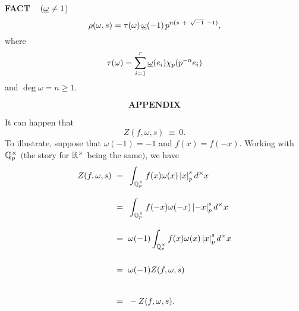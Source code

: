 \vspace{0.1cm}


\begin{x}{\small\bf FACT} \ %
$(\underline{\omega} \ne 1$)
\[
\rho(\omega,s) = \tau(\omega) \hspace{0.05cm} \underline{\omega}(-1) \hspace{0.05cm} p^{n(s \ + \ \sqrt{-1} \  -1)},
\]
where
\[
\tau(\omega) = \sum_{i = 1}^r \underline{\omega}(e_i) \chi_p(p^{-n}e_i)
\]
and $\deg \omega = n \ge 1.$
\end{x}


\[
\textbf{APPENDIX}
\]
\setcounter{theoremn}{0}


It can happen that
\\
\[
Z(f,\omega,s)  \ \equiv \  0.
\]
To illustrate, suppose that $\omega(-1) = -1$ and $f(x) = f(-x)$.  Working with $\mathbb{Q}_p^\times$ $($the story for $\mathbb{R}^\times$ being the same$)$, we have
\\
\begin{align*}
Z(f,\omega,s)	\ 	
&=\vsx\  \int_{\Q_p^\times} f(x) \omega(x) \abs{x}_p^s d^\times x\\
&=\vsx\  \int_{\Q_p^\times} f(-x) \omega(-x) \abs{-x}_p^s d^\times x\\
&=\vsx\ \omega(-1)  \int_{\Q_p^\times} f(x) \omega(x) \abs{x}_p^s d^\times x\\	
&=\vsx\ \omega(-1) Z(f,\omega,s)\\
&=\vsx\ -Z(f,\omega,s).
\end{align*}






















